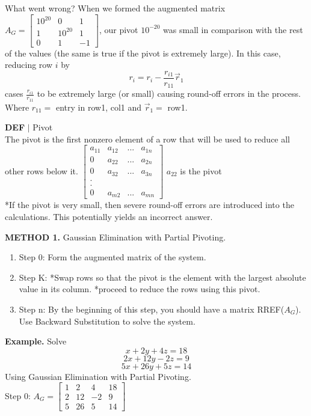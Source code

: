 \documentclass [12pt]{article}
\begin{document}
What went wrong? When we formed the augmented matrix $A_G=\begin{bmatrix}
10^{20}&0&1\\
1&10^{20}&1\\
0&1&-1
\end{bmatrix}$, our pivot $10^{-20}$ was small in comparison with the rest of the values (the same is true if the pivot is extremely large). In this case, reducing row $i$ by 
\[r_i=r_i-\frac{r_{i1}}{r_{11}}\overrightarrow{r}_1\] cases $\frac{r_{i1}}{r_11}$ to be extremely large (or small) causing round-off errors in the process. Where $r_{11}=$ entry in row1, col1 and $\overrightarrow{r}_1=$ row1.\\

\begin{framed}
\noindent\textbf{DEF} $|$ Pivot\\
The pivot is the first nonzero element of a row that will be used to reduce all other rows below it.
$\begin{bmatrix}
a_{11}&a_{12}&...&a_{1n}\\
0&a_{22}&...&a_{2n}\\
0&a_{32}&...&a_{3n}\\
.\\
.\\
0&a_{m2}&...&a_{mn}
\end{bmatrix}$
$a_{22}$ is the pivot\\
*If the pivot is very small, then severe round-off errors are introduced into the calculations. This potentially yields an incorrect answer. 
\end{framed}
\pagebreak
\noindent\textbf{METHOD 1.} Gaussian Elimination with Partial Pivoting.
\begin{enumerate}[\quad]
    \item Step 0: Form the augmented matrix of the system.
    \item Step K: *Swap rows so that the pivot is the element with the largest absolute value in its column. *proceed to reduce the rows using this pivot.
    \item Step n: By the beginning of this step, you should have a matrix RREF($A_G$). Use Backward Substitution to solve the system. 
\end{enumerate}
\noindent\textbf{Example.} Solve
\[x+2y+4z=18\]
\[2x+12y-2z=9\]
\[5x+26y+5z=14\]
Using Gaussian Elimination with Partial Pivoting.\\
Step 0: $A_G = \begin{bmatrix}
1&2&4&18\\
2&12&-2&9\\
5&26&5&14
\end{bmatrix}$\\\\
\end{document}
